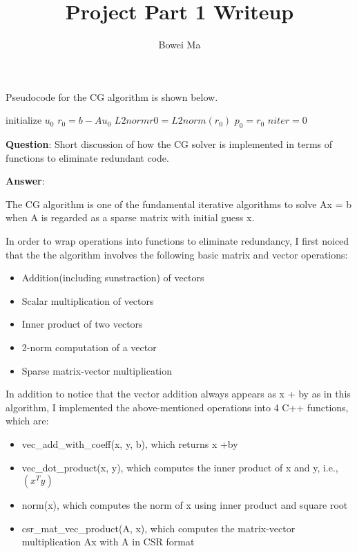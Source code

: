 \documentclass[11pt]{article} %
\title{Project Part 1 Writeup}
\author{Bowei Ma}
\begin{document}
\maketitle

\noindent
Pseudocode for the CG algorithm is shown below.

\begin{algorithm}[H]
  \SetAlgoLined
  initialize $u_{0}$\;
  $r_{0} = b - A u_{0}$\;
  $L2normr0 = L2norm(r_{0})$\;
  $p_{0} = r_{0}$\;
  $niter = 0$\;

\end{algorithm}

\bigskip
\noindent
\textbf{Question}: Short discussion of how the CG solver is implemented in terms of functions to eliminate redundant code.

\smallskip
\noindent
\textbf{Answer}:
\smallskip

The CG algorithm is one of the fundamental iterative algorithms to solve Ax = b when A is regarded as a sparse matrix with initial guess x.

In order to wrap operations into functions to eliminate redundancy, I first noiced that the the algorithm involves the following basic matrix and vector operations: 
\begin{itemize}
\item Addition(including sunstraction) of vectors
\item Scalar multiplication of vectors
\item Inner product of two vectors
\item 2-norm computation of a vector
\item Sparse matrix-vector multiplication
\end{itemize}

In addition to notice that the vector addition always appears as x + by as in this algorithm, I implemented the above-mentioned operations into 4 C++ functions, which are:
\begin{itemize}
\item vec\_add\_with\_coeff(x, y, b), which returns x +by
\item vec\_dot\_product(x, y), which computes the inner product of x and y, i.e., $(x^{T} y)$
\item norm(x), which computes the norm of x using inner product and square root
\item csr\_mat\_vec\_product(A, x), which computes the matrix-vector multiplication Ax with A in CSR format
\end{itemize}
\end{document}
